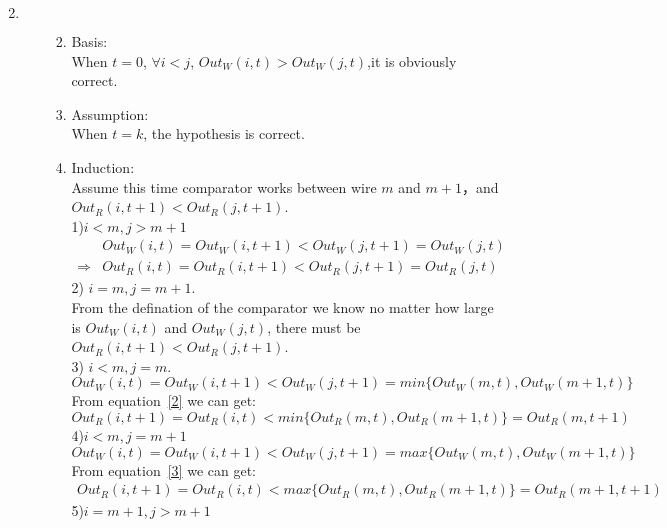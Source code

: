 \documentclass[12pt,a4paper]{article}
\makeatletter
\newtheorem*{solution}{Solution}
\theoremstyle{definition}
\renewenvironment{solution}[1][Solution] {\par\pushQED{\qed}\normalfont\topsep6\p@\@plus6\p@\relax\trivlist\item[\hskip\labelsep\bfseries#1\@addpunct{.}]\ignorespaces}{\popQED\endtrivlist\@endpefalse} \makeatother
\makeatother
\begin{document}
\begin{enumerate}
\begin{solution}
\begin{enumerate}
\begin{enumerate}
\begin{equation}
\begin{aligned}
        \end{aligned}
        \end{equation}
        \item Basis: \\When $t=0$, $\forall i<j$, $Out_W(i,t)>Out_W(j,t)$,it is obviously correct.
        \item Assumption:\\ When $t=k$, the hypothesis is correct.
        \item Induction:\\
        Assume this time comparator works between wire $m$ and $m+1$，and $Out_R(i,t+1)<Out_R(j,t+1)$.\\
        1)$i<m,j>m+1$
        \begin{equation}
            \begin{aligned}
            &Out_W(i,t)=Out_W(i,t+1)<Out_W(j,t+1)=Out_W(j,t)\\
            \Rightarrow& Out_R(i,t)=Out_R(i,t+1)<Out_R(j,t+1)=Out_R(j,t)
            \end{aligned}
        \end{equation}
        2) $i=m,j=m+1$.\\
        From the defination of the comparator we know no matter how large is $Out_W(i,t)$ and $Out_W(j,t)$, there must be $Out_R(i,t+1)<Out_R(j,t+1)$.\\
        3) $i<m,j=m$.
        \begin{equation}
                Out_W(i,t)=Out_W(i,t+1)<Out_W(j,t+1)=min\{Out_W(m,t),Out_W(m+1,t)\}
            \label{2}
        \end{equation}
        From equation~\ref{2} we can get:
        \begin{equation}
                 Out_R(i,t+1)=Out_R(i,t)<min\{Out_R(m,t),Out_R(m+1,t)\}=Out_R(m,t+1)
        \end{equation}
        4)$i<m,j=m+1$
        \begin{equation}
            Out_W(i,t)=Out_W(i,t+1)<Out_W(j,t+1)=max\{Out_W(m,t),Out_W(m+1,t)\}
            \label{3}
        \end{equation}
        From equation~\ref{3} we can get:
        \begin{equation}
            \begin{aligned}
            Out_R(i,t+1)=Out_R(i,t)<max\{Out_R(m,t),Out_R(m+1,t)\}=Out_R(m+1,t+1)
            \end{aligned}
        \end{equation}
        5)$i=m+1,j>m+1$ 
       \begin{equation}

\end{equation}
\end{enumerate}
\end{enumerate}
\end{solution}
\end{enumerate}
\end{document}
